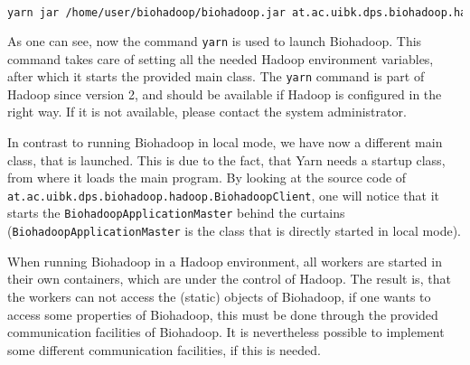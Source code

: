 \begin{lstlisting}[language=bash]
yarn jar /home/user/biohadoop/biohadoop.jar at.ac.uibk.dps.biohadoop.hadoop.BiohadoopClient /biohadoop/configs/simple-config-json
\end{lstlisting}

As one can see, now the command \texttt{yarn} is used to launch Biohadoop. This command takes care of setting all the needed Hadoop environment variables, after which it starts the provided main class. The \texttt{yarn} command is part of Hadoop since version 2, and should be available if Hadoop is configured in the right way. If it is not available, please contact the system administrator.

In contrast to running Biohadoop in local mode, we have now a different main class, that is launched. This is due to the fact, that Yarn needs a startup class, from where it loads the main program. By looking at the source code of \texttt{at.ac.uibk.dps.biohadoop.hadoop.BiohadoopClient}, one will notice that it starts the \texttt{BiohadoopApplicationMaster} behind the curtains (\texttt{BiohadoopApplicationMaster} is the class that is directly started in local mode).

When running Biohadoop in a Hadoop environment, all workers are started in their own containers, which are under the control of Hadoop. The result is, that the workers can not access the (static) objects of Biohadoop, if one wants to access some properties of Biohadoop, this must be done through the provided communication facilities of Biohadoop. It is nevertheless possible to implement some different communication facilities, if this is needed.